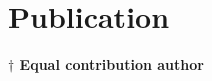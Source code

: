\documentclass[letterpaper,11pt]{article}
\newcommand{\resumeBlack}[1]{\item\small{{#1}}}
\newcommand{\resumeItemListStart}{\begin{itemize}}
\newcommand{\resumeItemListEnd}{\end{itemize}}
\begin{document}
\section{Publication}
\nocite{*}

{\small
	}

\textbf{$\dagger$ Equal contribution author}  
\end{document}
